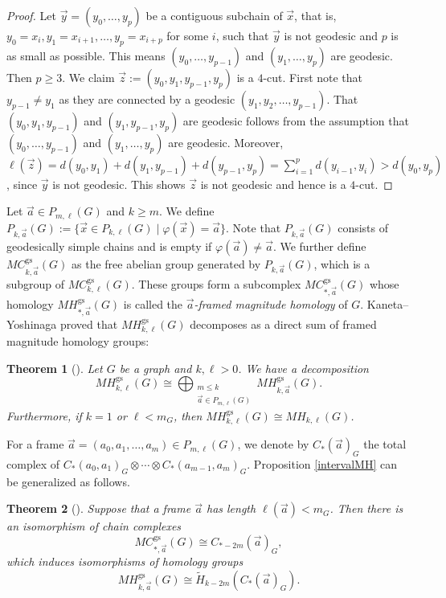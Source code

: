 \documentclass{amsart}
\numberwithin{equation}{section}
\newtheorem{thm}{Theorem}[section]
\theoremstyle{plain}
\theoremstyle{remark}
\theoremstyle{definition}
\numberwithin{equation}{section}
\newcommand{\gs}{\mathrm{gs}}
\begin{document}
\begin{proof}
    Let $\Vec{y}=(y_0,\ldots,y_p)$ be a contiguous subchain of $\Vec{x}$, that is, $y_0=x_i,y_1=x_{i+1},\ldots,y_p=x_{i+p}$ for some $i$, such that $\Vec{y}$ is not geodesic and $p$ is as small as possible. This means $(y_0,\ldots,y_{p-1})$ and $(y_1,\ldots,y_p)$ are geodesic. Then $p\geq 3$. We claim $\Vec{z}:=(y_0,y_1,y_{p-1},y_p)$ is a $4$-cut. First note that $y_{p-1}\neq y_1$ as they are connected by a geodesic $(y_1,y_2,\ldots,y_{p-1})$. That $(y_0,y_1,y_{p-1})$ and $(y_1,y_{p-1},y_p)$ are geodesic follows from the assumption that $(y_0,\ldots,y_{p-1})$ and $(y_1,\ldots,y_p)$ are geodesic. Moreover, $\ell(\Vec{z})=d(y_0,y_1)+d(y_1,y_{p-1})+d(y_{p-1},y_p)=\sum_{i=1}^pd(y_{i-1},y_i)>d(y_0,y_p)$, since $\Vec{y}$ is not geodesic. This shows $\Vec{z}$ is not geodesic and hence is a $4$-cut.
\end{proof}



Let $\Vec{a}\in P_{m,\ell}(G)$ and $k\geq m$. We define $P_{k,\Vec{a}}(G):=\{\Vec{x}\in P_{k,\ell}(G)\mid \varphi(\Vec{x})=\Vec{a}\}$. Note that $P_{k,\Vec{a}}(G)$ consists of geodesically simple chains and is empty if $\varphi(\Vec{a})\neq \Vec{a}$. We further define $MC^{\gs}_{k,\Vec{a}}(G)$ as the free abelian group generated by $P_{k,\Vec{a}}(G)$, which is a subgroup of $MC_{k,\ell}^{\gs}(G)$. These groups form a subcomplex $MC^{\gs}_{*,\Vec{a}}(G)$ whose homology $MH^{\gs}_{*,\Vec{a}}(G)$ is called the \emph{$\Vec{a}$-framed magnitude homology} of $G$. Kaneta--Yoshinaga \cite{Kaneta2021} proved that $MH_{k,\ell}^{\gs}(G)$ decomposes as a direct sum of framed magnitude homology groups:
\begin{thm}[{\cite[Theorem 3.12]{Kaneta2021}}]\label{gsmh}
    Let $G$ be a graph and $k,\ell>0$. We have a decomposition
    \[
MH_{k,\ell}^{\gs}(G)\cong\bigoplus_{\substack{m\leq k\\ \Vec{a}\in P_{m,\ell}(G)}} MH^{\gs}_{k,\Vec{a}}(G).
\]
Furthermore, if $k=1$ or $\ell<m_G$, then $MH_{k,\ell}^{\gs}(G)\cong MH_{k,\ell}(G)$.
\end{thm}

For a frame $\Vec{a}=(a_0,a_1,\ldots,a_m)\in P_{m,\ell}(G)$, we denote by $C_*(\Vec{a})_G$ the total complex of $C_*(a_0,a_1)_G\otimes\cdots\otimes C_*(a_{m-1},a_m)_G$. Proposition \ref{intervalMH} can be generalized as follows.

\begin{thm}[{\cite[Theorem 4.4 and Corollary 4.5]{Kaneta2021}}]\label{fmh}
    Suppose that a frame $\Vec{a}$ has length $\ell(\Vec{a})<m_G$. Then there is an isomorphism of chain complexes
    \[
    MC^{\gs}_{*,\Vec{a}}(G)\cong C_{*-2m}(\Vec{a})_G,
    \]
    which induces isomorphisms of homology groups
    \[
    MH^{\gs}_{k,\Vec{a}}(G)\cong \widetilde{H}_{k-2m}(C_*(\Vec{a})_G).
    \]
\end{thm}
\end{document}
